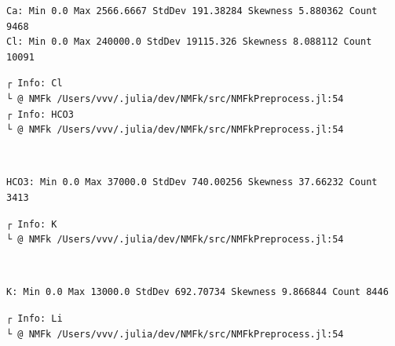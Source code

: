 \documentclass[11pt]{article}
\begin{document}
    \begin{Verbatim}[commandchars=\\\{\}]
Ca: Min 0.0 Max 2566.6667 StdDev 191.38284 Skewness 5.880362 Count 9468
Cl: Min 0.0 Max 240000.0 StdDev 19115.326 Skewness 8.088112 Count 10091
    \end{Verbatim}

    \begin{Verbatim}[commandchars=\\\{\}]
┌ Info: Cl
└ @ NMFk /Users/vvv/.julia/dev/NMFk/src/NMFkPreprocess.jl:54
┌ Info: HCO3
└ @ NMFk /Users/vvv/.julia/dev/NMFk/src/NMFkPreprocess.jl:54
    \end{Verbatim}

    \begin{center}
    \end{center}
    { \hspace*{\fill} \\}
    
    \begin{Verbatim}[commandchars=\\\{\}]
HCO3: Min 0.0 Max 37000.0 StdDev 740.00256 Skewness 37.66232 Count 3413
    \end{Verbatim}

    \begin{Verbatim}[commandchars=\\\{\}]
┌ Info: K
└ @ NMFk /Users/vvv/.julia/dev/NMFk/src/NMFkPreprocess.jl:54
    \end{Verbatim}

    \begin{center}
    \end{center}
    { \hspace*{\fill} \\}
    
    \begin{Verbatim}[commandchars=\\\{\}]
K: Min 0.0 Max 13000.0 StdDev 692.70734 Skewness 9.866844 Count 8446
    \end{Verbatim}

    \begin{Verbatim}[commandchars=\\\{\}]
┌ Info: Li
└ @ NMFk /Users/vvv/.julia/dev/NMFk/src/NMFkPreprocess.jl:54
    \end{Verbatim}
\end{document}
